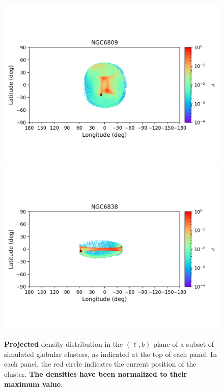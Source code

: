 \begin{figure}
        \includegraphics[clip=true, trim = 0mm 20mm 0mm 10mm, width=1\columnwidth]{images/error_plots_NGC6809.png}
        \includegraphics[clip=true, trim = 0mm 20mm 0mm 10mm, width=1\columnwidth]{images/error_plots_NGC6838.png}
        \caption[]{\textbf{Projected} density distribution in the $(\ell, b)$ plane of a subset of simulated globular clusters, as indicated at the top of each panel. In each panel, the red circle indicates the current position of the cluster. \textbf{The densities have been normalized to their maximum value}.}\label{stream15}
        \end{figure}

